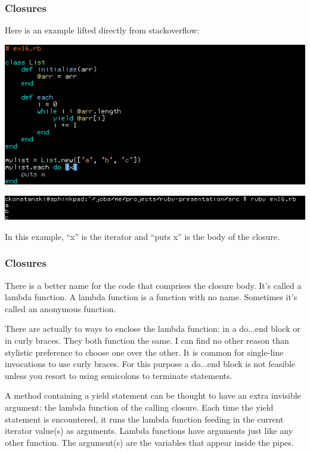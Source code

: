 \documentclass[helvetica,english,utf8,notitle,nologo]{beamer}
\begin{document}
\begin{frame}
  \frametitle{Closures}

  Here is an example lifted directly from stackoverflow:

  \includegraphics[scale=0.53]{src_16}

  \includegraphics[scale=0.5]{out_16}

  In this example, ``x'' is the iterator and ``puts x'' is the body of
  the closure.
\end{frame}

\begin{frame}
  \frametitle{Closures}

  There is a better name for the code that comprises the closure
  body. It's called a lambda function. A lambda function is a function
  with no name. Sometimes it's called an anonymous function.

  There are actually to ways to enclose the lambda function: in a
  do...end block or in curly braces. They both function the same. I
  can find no other reason than stylistic preference to choose one
  over the other. It is common for single-line invocations to use
  curly braces. For this purpose a do...end block is not feasible
  unless you resort to using semicolons to terminate statements.

  A method containing a yield statement can be thought to have an
  extra invisible argument: the lambda function of the calling
  closure. Each time the yield statement is encountered, it runs the
  lambda function feeding in the current iterator value(s) as
  arguments. Lambda functions have arguments just like any other
  function. The argument(s) are the variables that appear inside the
  pipes.
\end{frame}
\end{document}
